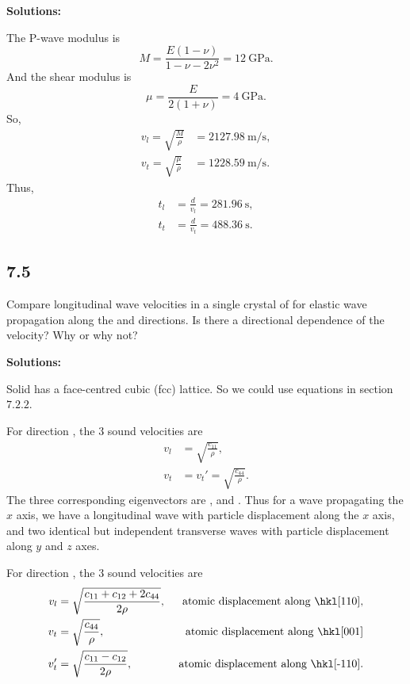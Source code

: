 \documentclass[12pt]{article}
\begin{document}
\textbf{Solutions:}

The P-wave modulus is
\begin{equation}
  M = \frac{ E (1 - \nu) }{ 1 - \nu - 2 \nu^2 } = \SI{12}{\giga\pascal}.
\end{equation}
And the shear modulus is
\begin{equation}
  \mu = \frac{ E }{ 2 ( 1 + \nu ) } = \SI{4}{\giga\pascal}.
\end{equation}
So,
\begin{align}
  v_l = \sqrt{\frac{ M }{ \rho }}   & = \SI{2127.98}{\meter\per\second}, \\
  v_t = \sqrt{\frac{ \mu }{ \rho }} & = \SI{1228.59}{\meter\per\second}.
\end{align}
Thus,
\begin{align}
  t_l & = \frac{ d }{ v_l } = \SI{281.96}{\second}, \\
  t_t & = \frac{ d }{ v_t } = \SI{488.36}{\second}.
\end{align}

\subsection{7.5}
Compare longitudinal wave velocities in a single crystal of  for elastic wave
propagation along the \hkl[100] and \hkl[110] directions.  Is there a directional dependence of the velocity?
Why or why not?

\textbf{Solutions:}

Solid  has a face-centred cubic (fcc) lattice. So we could use
equations in section $7.2.2$.

For direction \hkl[100], the $3$ sound velocities are
\begin{align}
  v_l & = \sqrt{\frac{ c_{11} }{ \rho }},        \\
  v_t & = v_t' = \sqrt{\frac{ c_{44} }{ \rho }}.
\end{align}
The three corresponding eigenvectors are \hkl[100], \hkl[010] and \hkl[001].
Thus for a wave propagating the $x$ axis, we have a longitudinal wave with particle displacement along the
$x$ axis, and two identical but independent transverse waves with particle displacement along $y$ and $z$ axes.

For direction \hkl[110], the $3$ sound velocities are
\begin{align}
  v_l  & = \sqrt{\frac{ c_{11} + c_{12} + 2 c_{44} }{ 2 \rho }}, & \text{atomic displacement along \hkl[110]},   \\
  v_t  & = \sqrt{\frac{ c_{44} }{ \rho }},                       & \text{ atomic displacement along \hkl[001]}   \\
  v_t' & = \sqrt{\frac{ c_{11} - c_{12} }{ 2 \rho }},            & \text{ atomic displacement along \hkl[-110]}.
\end{align}
\end{document}
